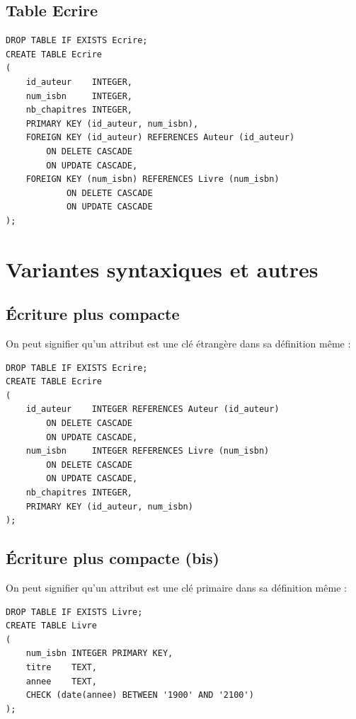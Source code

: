 \documentclass[10pt,cours,a4paper,firamath]{nsi}
\begin{document}
\subsection{Table \textbf{Ecrire}}
\begin{sql}
    \begin{verbatim}
DROP TABLE IF EXISTS Ecrire;
CREATE TABLE Ecrire
(
    id_auteur    INTEGER,
    num_isbn     INTEGER,
    nb_chapitres INTEGER,
    PRIMARY KEY (id_auteur, num_isbn),
    FOREIGN KEY (id_auteur) REFERENCES Auteur (id_auteur)
        ON DELETE CASCADE
        ON UPDATE CASCADE,
    FOREIGN KEY (num_isbn) REFERENCES Livre (num_isbn)
            ON DELETE CASCADE
            ON UPDATE CASCADE
);
\end{verbatim}
\end{sql}

\section{Variantes syntaxiques et autres}
\subsection{\'Ecriture plus compacte}
On peut signifier qu'un attribut est une clé étrangère dans sa définition même :
\begin{sql}
    \begin{verbatim}
DROP TABLE IF EXISTS Ecrire;
CREATE TABLE Ecrire
(
    id_auteur    INTEGER REFERENCES Auteur (id_auteur)
        ON DELETE CASCADE
        ON UPDATE CASCADE,
    num_isbn     INTEGER REFERENCES Livre (num_isbn)
        ON DELETE CASCADE
        ON UPDATE CASCADE,
    nb_chapitres INTEGER,
    PRIMARY KEY (id_auteur, num_isbn)
);
\end{verbatim}
\end{sql}


\subsection{\'Ecriture plus compacte (bis)}
On peut signifier qu'un attribut est une clé primaire dans sa définition même :
\begin{sql}
    \begin{verbatim}
DROP TABLE IF EXISTS Livre;
CREATE TABLE Livre
(
    num_isbn INTEGER PRIMARY KEY,
    titre    TEXT,
    annee    TEXT,
    CHECK (date(annee) BETWEEN '1900' AND '2100')
);
\end{verbatim}
\end{sql}
\end{document}

